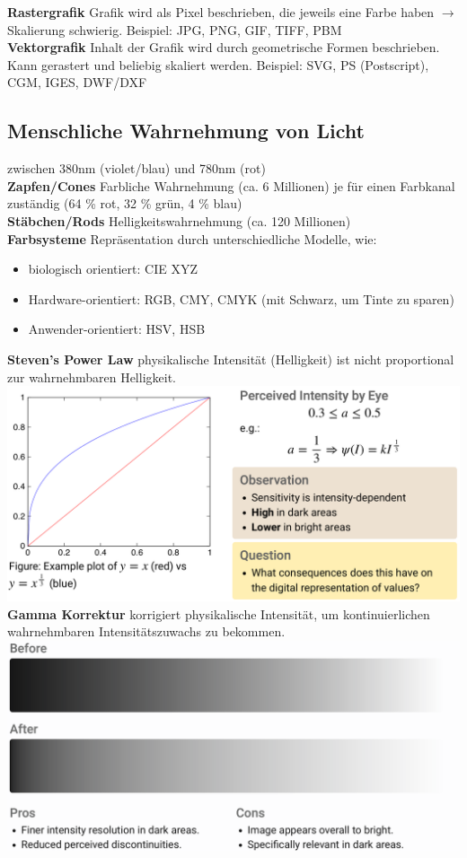 \documentclass[12pt]{article}
\begin{document}
	\textbf{Rastergrafik} Grafik wird als Pixel beschrieben, die jeweils eine Farbe haben $\rightarrow$ Skalierung schwierig. Beispiel: JPG, PNG, GIF, TIFF, PBM\\
	\textbf{Vektorgrafik} Inhalt der Grafik wird durch geometrische Formen beschrieben. Kann gerastert und beliebig skaliert werden. Beispiel: SVG, PS (Postscript), CGM, IGES, DWF/DXF\\


	\subsection{Menschliche Wahrnehmung von Licht}
	zwischen 380nm (violet/blau) und 780nm (rot)\\
	\textbf{Zapfen/Cones} Farbliche Wahrnehmung (ca. 6 Millionen) je für einen Farbkanal zuständig (64 \% rot, 32 \% grün, 4 \% blau)\\
	\textbf{Stäbchen/Rods} Helligkeitswahrnehmung (ca. 120 Millionen)\\
	\textbf{Farbsysteme} Repräsentation durch unterschiedliche Modelle, wie:
	\begin{itemize}
		\item biologisch orientiert: CIE XYZ
		\item Hardware-orientiert: RGB, CMY, CMYK (mit Schwarz, um Tinte zu sparen)
		\item Anwender-orientiert: HSV, HSB
	\end{itemize}
	\textbf{Steven's Power Law} physikalische Intensität (Helligkeit) ist nicht proportional zur wahrnehmbaren Helligkeit.\\
	\includegraphics[width=\linewidth]{figures/stevens-law.png}\\
	\textbf{Gamma Korrektur} korrigiert physikalische Intensität, um kontinuierlichen wahrnehmbaren Intensitätszuwachs zu bekommen.\\
	\includegraphics[width=\linewidth]{figures/gamma-correction.png}
\end{document}
